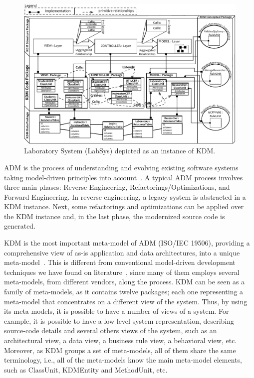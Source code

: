 
 
\begin{figure}[t]
	\centering
	\includegraphics[scale=0.78]{figuras/NovoSystem6}
	\caption{Laboratory System (LabSys) depicted as an instance of KDM.}
	\label{fig:system}
\end{figure}

ADM is the process of understanding  and evolving existing software systems taking model-driven principles into account~\cite{1686216}. A typical ADM process involves three main phases: Reverse Engineering, Refactorings/Optimizations, and Forward Engineering. In reverse engineering, a legacy system is abstracted in a KDM instance. Next, some refactorings and optimizations can be applied over the KDM instance and, in the last phase, the modernized source code is generated. 

KDM is the most important meta-model of ADM (ISO/IEC 19506), providing a comprehensive view of as-is application and data architectures, into a unique meta-model~\cite{Perez-Castillo:2011:KDM}. This is different from conventional model-driven development techniques we have found on literature~\cite{7051941}, since many of them employs several meta-models, from different vendors, along the process. KDM can be seen as a family of meta-models, as it contains twelve packages; each one representing a meta-model that concentrates on a different view of the system. Thus, by using its  meta-models, it is possible to have a number of views of a system. For example, it is possible to have a low level system representation, describing source-code details and several others views of the system, such as an architectural view, a data view, a business rule view, a behavioral view, etc. Moreover, as KDM groups a set of meta-models, all of them share the same terminology, i.e., all of the meta-models know the main meta-model elements, such as ClassUnit, KDMEntity and MethodUnit, etc.

